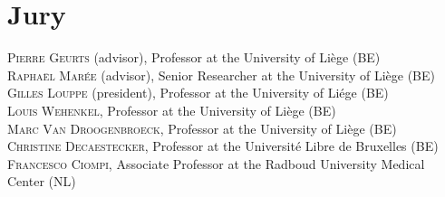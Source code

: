 \chapter*{Jury}
{
  \noindent \textsc{Pierre Geurts} (advisor), Professor at the University of Li{\`e}ge (BE) \\
  
  \noindent \textsc{Raphaël Marée} (advisor), Senior Researcher at the University of Li{\`e}ge (BE) \\
  
  \noindent \textsc{Gilles Louppe} (president), Professor at the University of Li{\'e}ge (BE) \\
  
  \noindent \textsc{Louis Wehenkel}, Professor at the University of Li{\`e}ge (BE) \\
  
  \noindent \textsc{Marc Van Droogenbroeck}, Professor at the University of Li{\`e}ge (BE) \\
  
  \noindent \textsc{Christine Decaestecker}, Professor at the Universit{\'e} Libre de Bruxelles (BE) \\
  
  \noindent \textsc{Francesco Ciompi}, Associate Professor at the Radboud University Medical Center (NL)
}

